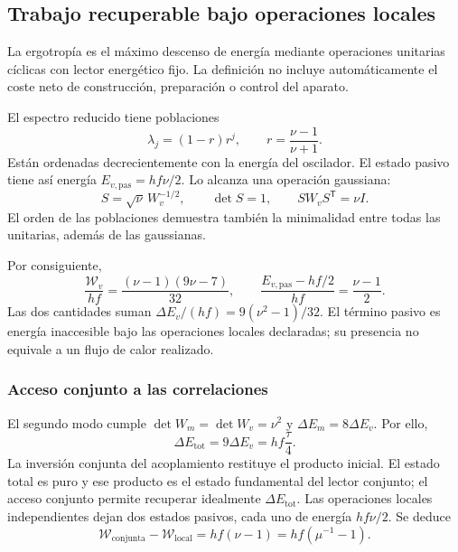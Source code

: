 \subsection{Trabajo recuperable bajo operaciones locales}
\label{md:aux:ergotropia}

La ergotropía es el máximo descenso de energía mediante
operaciones unitarias cíclicas con lector energético fijo.
La definición no incluye automáticamente el coste neto de
construcción, preparación o control del aparato.

El espectro reducido tiene poblaciones
\begin{equation}
 \lambda_j=(1-r)r^j,\qquad r=\frac{\nu-1}{\nu+1}.
 \label{md:aux:espectro-gaussiano}
\end{equation}
Están ordenadas decrecientemente con la energía del oscilador.
El estado pasivo tiene así energía $E_{v,\mathrm{pas}}=hf\nu/2$.
Lo alcanza una operación gaussiana:
\begin{equation}
 S=\sqrt\nu\,W_v^{-1/2},\qquad
 \det S=1,\qquad SW_vS^{\mathsf T}=\nu I.
 \label{md:aux:pasivacion}
\end{equation}
El orden de las poblaciones demuestra también la minimalidad
entre todas las unitarias, además de las gaussianas.

Por consiguiente,
\begin{equation}
 \boxed{
 \frac{\mathcal W_v}{hf}
 =\frac{(\nu-1)(9\nu-7)}{32},\qquad
 \frac{E_{v,\mathrm{pas}}-hf/2}{hf}=\frac{\nu-1}{2}.}
 \label{md:aux:trabajo-visible}
\end{equation}
Las dos cantidades suman
$\Delta E_v/(hf)=9(\nu^2-1)/32$. El término pasivo es
energía inaccesible bajo las operaciones locales declaradas;
su presencia no equivale a un flujo de calor realizado.

\subsubsection{Acceso conjunto a las correlaciones}
\label{md:aux:acceso-conjunto}

El segundo modo cumple $\det W_m=\det W_v=\nu^2$ y
$\Delta E_m=8\Delta E_v$. Por ello,
\begin{equation}
 \Delta E_{\mathrm{tot}}=9\Delta E_v=hf\frac\tau4.
 \label{md:aux:energia-conjunta}
\end{equation}
La inversión conjunta del acoplamiento restituye el producto
inicial. El estado total es puro y ese producto es el estado
fundamental del lector conjunto; el acceso conjunto permite
recuperar idealmente $\Delta E_{\mathrm{tot}}$.
Las operaciones locales independientes dejan dos estados
pasivos, cada uno de energía $hf\nu/2$. Se deduce
\begin{equation}
 \boxed{\mathcal W_{\mathrm{conjunta}}-\mathcal W_{\mathrm{local}}
 =hf(\nu-1)=hf(\mu^{-1}-1).}
 \label{md:aux:ventaja-conjunta}
\end{equation}

